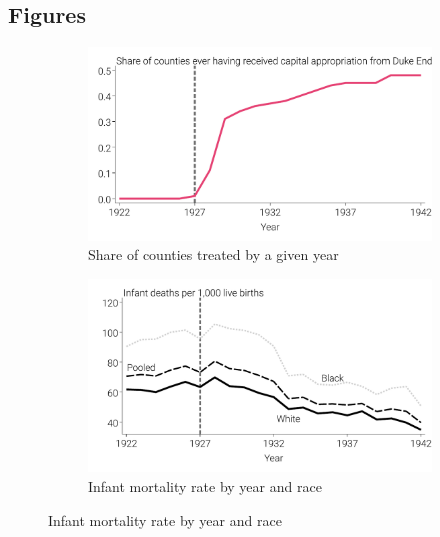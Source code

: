 \documentclass[12pt]{article}
\begin{document}
\FloatBarrier
\newpage
{}
\begin{landscape}
\section[Figures]{Figures\label{sec:Figures}}
\begin{figure}[!ht]

    \caption[Rollout of Duke support and changes in infant mortality rate, 1922-1942]{Rollout of Duke support and changes in infant mortality rate, 1922-1942}
    \centering
    \begin{minipage}{.48\linewidth}
    \begin{subfigure}{\linewidth}
        \centering
        \includegraphics[width=0.8\linewidth]{../analysis/output/main/figure_1a_share_counties_treated.pdf}
        \caption[Share of counties treated by a given year]{Share of counties treated by a given year}
        \label{fig:share-counties-treated-by-year}
    \end{subfigure}
    \begin{subfigure}{\linewidth}
      \centering
      \includegraphics[width=0.8\linewidth]{../analysis/output/main/figure_1c_infant_morality_by_race_over_time.pdf}
      \caption[Infant mortality rate by year and race]{Infant mortality rate by year and race}
      \label{fig:plot-imr-race-year}
  \end{subfigure}


\end{minipage}
\end{figure}
\end{landscape}
\end{document}
